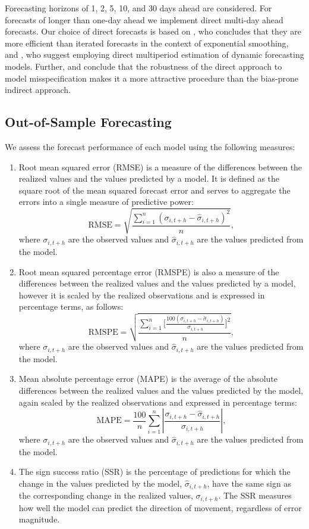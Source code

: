 \documentclass[12pt,a4paper]{article}
\begin{document}
Forecasting horizons of 1, 2, 5, 10, and 30 days ahead are considered. For forecasts of longer than one-day ahead we implement direct multi-day ahead forecasts. Our choice of direct forecasts is based on \cite{Cox61}, who concludes that they are more efficient than iterated forecasts in the context of exponential smoothing, and \cite{Klein68}, who suggest employing direct multiperiod estimation of dynamic forecasting models. Further, \cite{Bhansali99} and \cite{Ing03} conclude that the robustness of the direct approach to model misspecification makes it a more attractive procedure than the bias-prone indirect approach.

\subsection{Out-of-Sample Forecasting}\label{sec:Out of Sample Forecasting}

We assess the forecast performance of each model using the following measures:
\begin{enumerate}
\item Root mean squared error (RMSE) is a measure of the differences between the realized values and the values predicted by a model. It is defined as the square root of the mean squared forecast error and serves to aggregate the errors into a single measure of predictive power:\\
\[
\text{RMSE}=\sqrt{\frac{\sum_{i=1}^{n}(\sigma_{i,t+h}-\widehat{\sigma}_{i,t+h})^{2}}{n}},
\]
where $\sigma_{i,t+h}$ are the observed values and $\widehat{\sigma}_{i,t+h}$ are the values predicted from the model.
\item Root mean squared percentage error (RMSPE) is also a measure of the differences between the realized values and the values predicted by a model, however it is scaled by the realized observations and is expressed in percentage terms, as follows:\\
\[
\text{RMSPE}=\sqrt{\frac{\sum_{i=1}^{n}\Big[\frac{100(\sigma_{i,t+h}-\widehat{\sigma}_{i,t+h})}{\sigma_{i,t+h}}\Big]^{2}}{n}},
\]
where $\sigma_{i,t+h}$ are the observed values and $\widehat{\sigma}_{i,t+h}$ are the values predicted from the model.
\item Mean absolute percentage error (MAPE) is the average of the absolute differences between the realized values and the values predicted by the model, again scaled by the realized observations and expressed in percentage terms:\\
\[
\text{MAPE}=\frac{100}{n}{\displaystyle \sum_{i=1}^{n}\left|\frac{\sigma_{i,t+h}-\widehat{\sigma}_{i,t+h}}{\sigma_{i,t+h}}\right|,}
\]
where $\sigma_{i,t+h}$ are the observed values and $\widehat{\sigma}_{i,t+h}$ are the values predicted from the model.
\item The sign success ratio (SSR) is the percentage of predictions for which the change in the values predicted by the model, $\widehat{\sigma}_{i,t+h}$, have the same sign as the corresponding change in the realized values, $\sigma_{i,t+h}$. The SSR measures how well the model can predict the direction of movement, regardless of error magnitude.\\
\end{enumerate}
\end{document}
